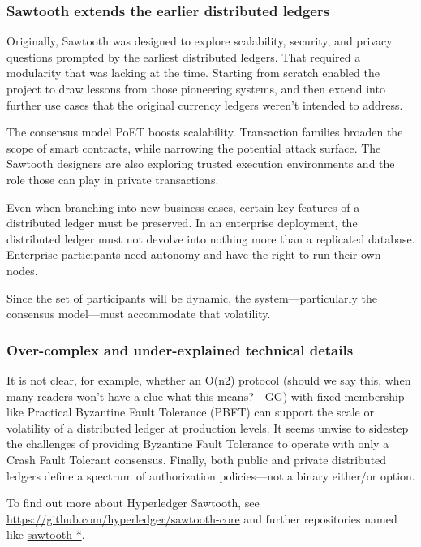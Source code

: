 \subsubsection{Sawtooth extends the earlier distributed ledgers}
Originally, Sawtooth was designed to explore scalability, security, and privacy questions prompted by the earliest distributed ledgers. 
That required a modularity that was lacking at the time. 
Starting from scratch enabled the project to draw lessons from those pioneering systems, and then extend into further use cases that the original currency ledgers weren't intended to address. 

The consensus model PoET boosts scalability.
Transaction families broaden the scope of smart contracts, while narrowing the potential attack surface. 
The Sawtooth designers are also exploring trusted execution environments and the role those can play in private transactions.

Even when branching into new business cases, certain key features of a distributed ledger must be preserved. 
In an enterprise deployment, the distributed ledger must not devolve into nothing more than a replicated database. 
Enterprise participants need autonomy and have the right to run their own nodes. 

Since the set of participants will  be dynamic, the system---particularly the consensus model---must accommodate that volatility. 

\subsubsection{Over-complex and under-explained technical details}
It is not clear, for example, whether an O(n2) protocol (should we  say this, when many readers won't have a clue what this means?---GG) with fixed membership like Practical Byzantine Fault Tolerance (PBFT) can support the scale or volatility of a distributed ledger at production levels. 
It seems unwise to sidestep the challenges of providing Byzantine Fault Tolerance to operate with only a Crash Fault Tolerant consensus. 
Finally, both public and private distributed ledgers define a spectrum of authorization policies---not a binary either/or option.

To find out more about Hyperledger Sawtooth, see \url{https://github.com/hyperledger/sawtooth-core} and further repositories named like \url{sawtooth-*}.

